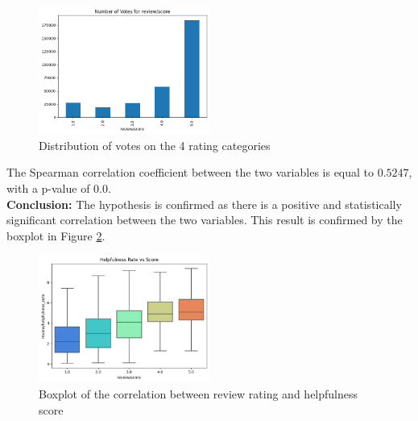 \begin{figure}[H]
    \centering
    \includegraphics[width=0.5\textwidth]{./figures/h3_votes_distribution.png}
    \caption{Distribution of votes on the 4 rating categories}
    \label{fig:h3_votes_distribution}
\end{figure}
\noindent 
The Spearman correlation coefficient between the two variables is equal to $0.5247$, with a p-value of $0.0$. \\
\textbf{Conclusion:}
The hypothesis is confirmed as there is a positive and statistically significant correlation between the two variables. This result is confirmed by 
the boxplot in Figure \ref{fig:h3_boxplot}.

\begin{figure}[H]
    \centering
    \includegraphics[width=0.5\textwidth]{./figures/h3_boxplot.png}
    \caption{Boxplot of the correlation between review rating and helpfulness score}
    \label{fig:h3_boxplot}
\end{figure}
